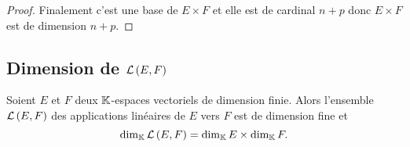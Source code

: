 \begin{proof}
  Finalement c'est une base de \(E \times F\) et elle est de cardinal \(n+p\) 
  donc \(E \times F\) est de dimension \(n+p\).
\end{proof}

\subsection{Dimension de \(\mathcal{L}\left(E,F\right)\)}

\begin{theo}
  Soient \(E\) et \(F\) deux \(\mathbb{K}\)-espaces vectoriels de dimension finie. Alors 
  l'ensemble \(\mathcal{L}\left(E,F\right)\) des applications linéaires de \(E\) vers \(F\) est 
  de dimension fine et
  \begin{equation}
    \operatorname{dim}_{\mathbb{K}} \mathcal{L}\left(E,F\right) = \operatorname{dim}_{\mathbb{K}} E \times \operatorname{dim}_{\mathbb{K}} F.
  \end{equation}
\end{theo}
